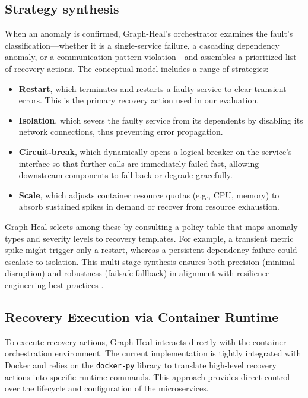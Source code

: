 \documentclass[11pt,conference]{IEEEtran}
\begin{document}
\subsection{Strategy synthesis}
\label{sec:strategy-synthesis}

When an anomaly is confirmed, Graph-Heal's orchestrator examines the fault's classification—whether it is a single‐service failure, a cascading dependency anomaly, or a communication pattern violation—and assembles a prioritized list of recovery actions.  The conceptual model includes a range of strategies:

\begin{itemize}
    \item \textbf{Restart}, which terminates and restarts a faulty service to clear transient errors. This is the primary recovery action used in our evaluation.
    \item \textbf{Isolation}, which severs the faulty service from its dependents by disabling its network connections, thus preventing error propagation.
  \item \textbf{Circuit‐break}, which dynamically opens a logical breaker on the service's interface so that further calls are immediately failed fast, allowing downstream components to fall back or degrade gracefully.
  \item \textbf{Scale}, which adjusts container resource quotas (e.g., CPU, memory) to absorb sustained spikes in demand or recover from resource exhaustion.
\end{itemize}

Graph-Heal selects among these by consulting a policy table that maps anomaly types and severity levels to recovery templates.  For example, a transient metric spike might trigger only a restart, whereas a persistent dependency failure could escalate to isolation.  This multi‐stage synthesis ensures both precision (minimal disruption) and robustness (failsafe fallback) in alignment with resilience‐engineering best practices \cite{saleh2018automated}.

\subsection{Recovery Execution via Container Runtime}
\label{sec:adapter-framework}

To execute recovery actions, Graph-Heal interacts directly with the container orchestration environment. The current implementation is tightly integrated with Docker and relies on the \texttt{docker-py} library to translate high-level recovery actions into specific runtime commands. This approach provides direct control over the lifecycle and configuration of the microservices.
\end{document}
